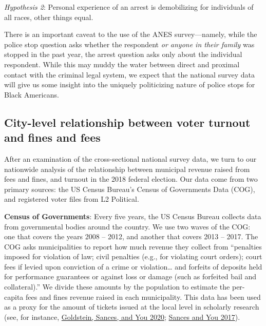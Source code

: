 \documentclass[
  12pt,
]{article}
\begin{document}
\emph{Hypothesis 2}: Personal experience of an arrest is demobilizing for individuals of all races, other things equal.

There is an important caveat to the use of the ANES survey---namely, while the police stop question asks whether the respondent \emph{or anyone in their family} was stopped in the past year, the arrest question asks only about the individual respondent. While this may muddy the water between direct and proximal contact with the criminal legal system, we expect that the national survey data will give us some insight into the uniquely politicizing nature of police stops for Black Americans.

\hypertarget{city-level-relationship-between-voter-turnout-and-fines-and-fees}{%
\subsection*{City-level relationship between voter turnout and fines and fees}\label{city-level-relationship-between-voter-turnout-and-fines-and-fees}}

After an examination of the cross-sectional national survey data, we turn to our nationwide analysis of the relationship between municipal revenue raised from fees and fines, and turnout in the 2018 federal election. Our data come from two primary sources: the US Census Bureau's Census of Governments Data (COG), and registered voter files from L2 Political.

\textbf{Census of Governments}: Every five years, the US Census Bureau collects data from governmental bodies around the country. We use two waves of the COG: one that covers the years 2008 -- 2012, and another that covers 2013 -- 2017. The COG asks municipalities to report how much revenue they collect from ``penalties imposed for violation of law; civil penalties (e.g., for violating court orders); court fees if levied upon conviction of a crime or violation\ldots{} and forfeits of deposits held for performance guarantees or against loss or damage (such as forfeited bail and collateral).'' We divide these amounts by the population to estimate the per-capita fees and fines revenue raised in each municipality. This data has been used as a proxy for the amount of tickets issued at the local level in scholarly research (see, for instance, \protect\hyperlink{ref-Goldstein2020}{Goldstein, Sances, and You 2020}; \protect\hyperlink{ref-Sances2017}{Sances and You 2017}).
\end{document}
